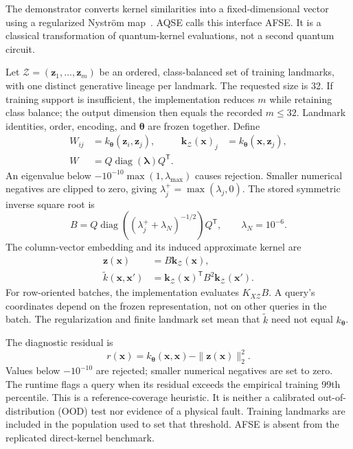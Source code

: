 The demonstrator converts kernel similarities into a fixed-dimensional vector using a regularized Nystr\"om map~\cite{williams2001nystrom}. AQSE calls this interface AFSE. It is a classical transformation of quantum-kernel evaluations, not a second quantum circuit.

Let $\mathcal Z=(\mathbf z_1,\ldots,\mathbf z_m)$ be an ordered, class-balanced set of training landmarks, with one distinct generative lineage per landmark. The requested size is 32. If training support is insufficient, the implementation reduces $m$ while retaining class balance; the output dimension then equals the recorded $m\leq32$. Landmark identities, order, encoding, and $\boldsymbol\theta$ are frozen together. Define
\begin{align}
 W_{ij}&=k_{\boldsymbol\theta}(\mathbf z_i,\mathbf z_j),
 &\mathbf k_{\mathcal Z}(\mathbf x)_j
    &=k_{\boldsymbol\theta}(\mathbf x,\mathbf z_j),\nonumber\\
 W&=Q\operatorname{diag}(\boldsymbol\lambda)Q^{\mathsf T}.
 \label{eq:landmark-gram}
\end{align}
An eigenvalue below $-10^{-10}\max(1,\lambda_{\max})$ causes rejection. Smaller numerical negatives are clipped to zero, giving $\lambda_j^+=\max(\lambda_j,0)$. The stored symmetric inverse square root is
\begin{equation}
 B=Q\operatorname{diag}\!\left((\lambda_j^++\lambda_N)^{-1/2}\right)
       Q^{\mathsf T},\qquad \lambda_N=10^{-6}.
 \label{eq:nystrom-basis}
\end{equation}
The column-vector embedding and its induced approximate kernel are
\begin{align}
 \mathbf z(\mathbf x)&=B\mathbf k_{\mathcal Z}(\mathbf x),
 \label{eq:afse-map}\\
 \widetilde k(\mathbf x,\mathbf x')
   &=\mathbf k_{\mathcal Z}(\mathbf x)^{\mathsf T}B^2
                              \mathbf k_{\mathcal Z}(\mathbf x').
 \label{eq:afse-kernel}
\end{align}
For row-oriented batches, the implementation evaluates $K_{X\mathcal Z}B$. A query's coordinates depend on the frozen representation, not on other queries in the batch. The regularization and finite landmark set mean that $\widetilde k$ need not equal $k_{\boldsymbol\theta}$.

The diagnostic residual is
\begin{equation}
 r(\mathbf x)=k_{\boldsymbol\theta}(\mathbf x,\mathbf x)
                    -\|\mathbf z(\mathbf x)\|_2^2.
 \label{eq:afse-residual}
\end{equation}
Values below $-10^{-10}$ are rejected; smaller numerical negatives are set to zero. The runtime flags a query when its residual exceeds the empirical training 99th percentile. This is a reference-coverage heuristic. It is neither a calibrated out-of-distribution (OOD) test nor evidence of a physical fault. Training landmarks are included in the population used to set that threshold. AFSE is absent from the replicated direct-kernel benchmark.

